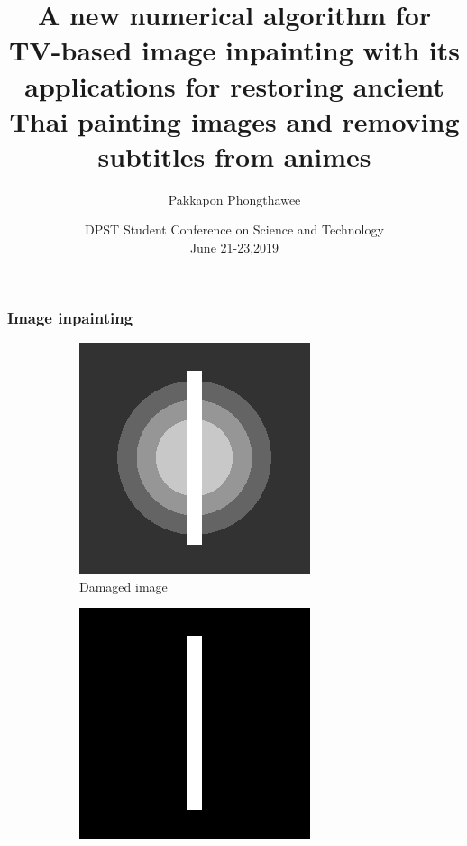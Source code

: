 \documentclass[xcolor=dvipsnames, xetex,serif]{beamer}
\title[numerical algorithm for image inpainting]{A new numerical algorithm for TV-based image inpainting with its applications for restoring ancient Thai painting images and removing subtitles from animes}
\author[Pakkapon]{Pakkapon Phongthawee}
\institute[Silpakorn]{
 	Department of Mathematics\\
 	Silpakorn University \\}
\date[DPSTCON 2019]{DPST Student Conference on Science and Technology\\June 21-23,2019}
\begin{document}
    \begin{frame}
        \titlepage 
    \end{frame}
    \begin{frame}
        \frametitle{Image inpainting} 
        \begin{figure}[H]
            \centering
            \begin{subfigure}{0.3\linewidth}
                \centering
                \includegraphics[width=0.8\linewidth]{images/grayscale_inpaint/toinpaint.png}
                \caption{Damaged image}
            \end{subfigure}
            \begin{subfigure}{0.3\linewidth}
                \centering
                \includegraphics[width=0.8\linewidth]{images/grayscale_inpaint/inpaintdomain.png}

\end{subfigure}
\end{figure}
\end{frame}
\end{document}
